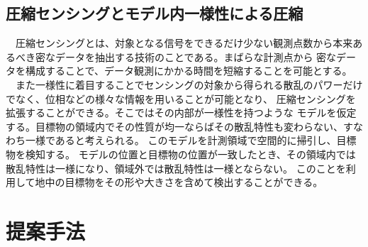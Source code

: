 \documentclass[12pt,a4paper]{jsreport}
\begin{document}
\section{圧縮センシングとモデル内一様性による圧縮}
　圧縮センシングとは、対象となる信号をできるだけ少ない観測点数から本来あるべき密なデータを抽出する技術のことである。まばらな計測点から
密なデータを構成することで、データ観測にかかる時間を短縮することを可能とする。
\\　また一様性に着目することでセンシングの対象から得られる散乱のパワーだけでなく、位相などの様々な情報を用いることが可能となり、
圧縮センシングを拡張することができる\cite{imai}。そこではその内部が一様性を持つような
モデルを仮定する。目標物の領域内でその性質が均一ならばその散乱特性も変わらない、すなわち一様であると考えられる。
このモデルを計測領域で空間的に掃引し、目標物を検知する。
モデルの位置と目標物の位置が一致したとき、その領域内では散乱特性は一様になり、領域外では散乱特性は一様とならない。
このことを利用して地中の目標物をその形や大きさを含めて検出することができる。


\chapter{提案手法}
\end{document}
